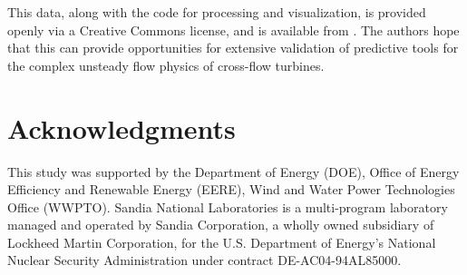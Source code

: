 \documentclass[10pt,letterpaper]{article}
\begin{document}
This data, along with the code for processing and visualization, is provided
openly via a Creative Commons license, and is available from
\cite{Bachant2015-RM2-data}. The authors hope that this can provide
opportunities for extensive validation of predictive tools for the complex
unsteady flow physics of cross-flow turbines.


\section*{Acknowledgments}

This study was supported by the Department of Energy (DOE), Office of Energy
Efficiency and Renewable Energy (EERE), Wind and Water Power Technologies Office
(WWPTO). Sandia National Laboratories is a multi-program laboratory managed and
operated by Sandia Corporation, a wholly owned subsidiary of Lockheed Martin
Corporation, for the U.S. Department of Energy's National Nuclear Security
Administration under contract DE-AC04-94AL85000.

\nolinenumbers

%


\end{document}
